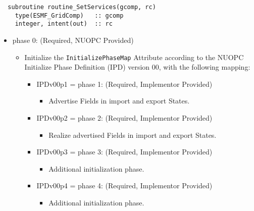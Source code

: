 \begin{verbatim}  subroutine routine_SetServices(gcomp, rc)
    type(ESMF_GridComp)   :: gcomp
    integer, intent(out)  :: rc
\end{verbatim}

\begin{itemize}
\item phase 0: ({\sc Required, NUOPC Provided})
  \begin{itemize}
  \item Initialize the {\tt InitializePhaseMap} Attribute according to the NUOPC Initialize Phase Definition (IPD) version 00, with the following mapping:
    \begin{itemize}
    \item IPDv00p1 = phase 1: ({\sc Required, Implementor Provided})
      \begin{itemize}
      \item Advertise Fields in import and export States.
      \end{itemize}
    \item IPDv00p2 = phase 2: ({\sc Required, Implementor Provided})
      \begin{itemize}
      \item Realize advertised Fields in import and export States.
      \end{itemize}  
    \item IPDv00p3 = phase 3: ({\sc Required, Implementor Provided})
      \begin{itemize}
      \item Additional initialization phase.
      \end{itemize}
    \item IPDv00p4 = phase 4: ({\sc Required, Implementor Provided})
      \begin{itemize}
      \item Additional initialization phase.
      \end{itemize}
    \end{itemize}  
  \end{itemize}  
\end{itemize}

